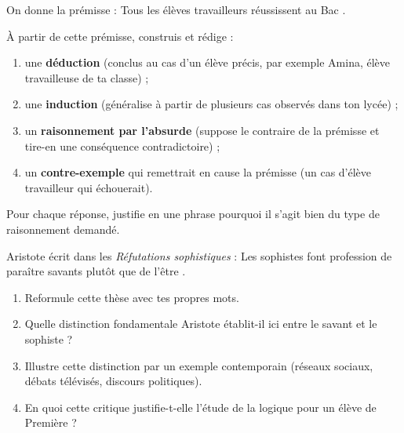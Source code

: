 \documentclass[11pt]{article}
\begin{document}
\begin{exercice}
On donne la prémisse : \guillemotleft Tous les élèves travailleurs réussissent au Bac \guillemotright.

À partir de cette prémisse, construis et rédige :
\begin{enumerate}
\item une \textbf{déduction} (conclus au cas d'un élève précis, par exemple Amina, élève travailleuse de ta classe) ;
\item une \textbf{induction} (généralise à partir de plusieurs cas observés dans ton lycée) ;
\item un \textbf{raisonnement par l'absurde} (suppose le contraire de la prémisse et tire-en une conséquence contradictoire) ;
\item un \textbf{contre-exemple} qui remettrait en cause la prémisse (un cas d'élève travailleur qui échouerait).
\end{enumerate}
Pour chaque réponse, justifie en une phrase pourquoi il s'agit bien du type de raisonnement demandé.
\end{exercice}

\begin{exercice}
Aristote écrit dans les \emph{Réfutations sophistiques} : \guillemotleft Les sophistes font profession de paraître savants plutôt que de l'être \guillemotright.

\begin{enumerate}
\item Reformule cette thèse avec tes propres mots.
\item Quelle distinction fondamentale Aristote établit-il ici entre le savant et le sophiste ?
\item Illustre cette distinction par un exemple contemporain (réseaux sociaux, débats télévisés, discours politiques).
\item En quoi cette critique justifie-t-elle l'étude de la logique pour un élève de Première ?
\end{enumerate}
\end{exercice}
\end{document}
